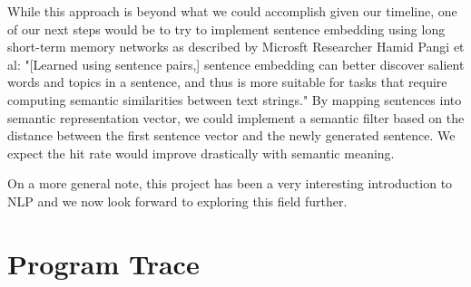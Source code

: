 \documentclass[11pt]{article}
\begin{document}
While this approach is beyond what we could accomplish given our timeline, one of our next steps would be to try to implement sentence embedding using long short-term memory networks as described by Microsft Researcher Hamid Pangi et al:
"[Learned using sentence pairs,] sentence embedding can better discover salient words and topics in a sentence, and thus is more suitable for tasks that require computing semantic similarities between text strings."\cite{palangi2015} By mapping sentences into semantic representation vector, we could implement a semantic filter based on the distance between the first sentence vector and the newly generated sentence. We expect the hit rate would improve drastically with semantic meaning. 

On a more general note, this project has been a very interesting introduction to NLP and we now look forward to exploring this field further. 


\appendix

\section{Program Trace}
\end{document}
